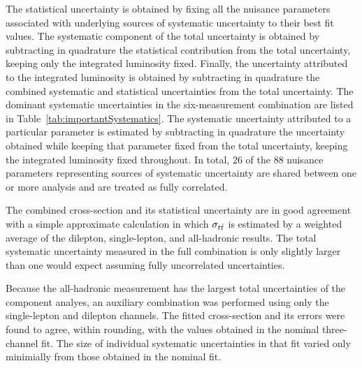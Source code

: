 The statistical uncertainty is obtained by fixing all the nuisance parameters associated with underlying sources of systematic uncertainty to their best fit values.  
The systematic component of the total uncertainty is obtained by subtracting in quadrature the statistical contribution from the total uncertainty, keeping only the integrated luminosity fixed.
Finally, the uncertainty attributed to the integrated luminosity is obtained by subtracting in quadrature the combined systematic and statistical uncertainties from the total uncertainty.
The dominant systematic uncertainties in the six-measurement combination are listed in Table~\ref{tab:importantSystematics}. 
The systematic uncertainty attributed to a particular parameter is estimated by subtracting in quadrature the uncertainty obtained
while keeping that parameter fixed from the total uncertainty, keeping the integrated luminosity fixed throughout.
In total, 26 of the 88 nuisance parameters representing sources of systematic uncertainty are shared between one or more analysis and are treated as fully correlated.

The combined cross-section and its statistical uncertainty are in good agreement with a simple approximate calculation in which $\sigma_{t\bar{t}}$ is estimated by a weighted average of the dilepton, single-lepton, and all-hadronic results.
The total systematic uncertainty measured in the full combination is only slightly larger than one would expect assuming fully uncorrelated uncertainties. 

Because the all-hadronic measurement has the largest total uncertainties of the component analyes, an auxiliary combination was performed using only the single-lepton and dilepton channels.
The fitted cross-section and its errors were found to agree, within rounding, with the values obtained in the nominal three-channel fit.
The size of individual systematic uncertainties in that fit varied only minimially from those obtained in the nominal fit.


